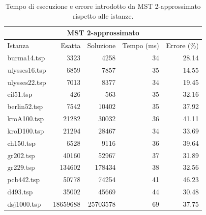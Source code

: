 \begin{table}[h]
    \centering

    \begin{tabular}{lrrrr}
    \toprule
    \multicolumn{5}{c}{MST 2-approssimato} \\
    \hline
     Istanza       &   Esatta &        Soluzione &   Tempo (ms) &   Errore (\%) \\
    \hline
    burma14.tsp   &     3323 &   4258           &          34 &       28.14 \\
    ulysses16.tsp &     6859 &   7857           &          35 &       14.55 \\
    ulysses22.tsp &     7013 &   8377           &          34 &       19.45 \\
    eil51.tsp     &      426 &    563           &          35 &       32.16 \\
    berlin52.tsp  &     7542 &  10402           &          35 &       37.92 \\
    kroA100.tsp   &    21282 &  30032           &          36 &       41.11 \\
    kroD100.tsp   &    21294 &  28467           &          34 &       33.69 \\
    ch150.tsp     &     6528 &   9116           &          36 &       39.64 \\
    gr202.tsp     &    40160 &  52967           &          37 &       31.89 \\
    gr229.tsp     &   134602 & 178434           &          38 &       32.56 \\
    pcb442.tsp    &    50778 &  74254           &          41 &       46.23 \\
    d493.tsp      &    35002 &  45669           &          44 &       30.48 \\
    dsj1000.tsp   & 18659688 &  25703578   &          69 &       37.75 \\
    \bottomrule
    \end{tabular}

    \caption{Tempo di esecuzione e errore introdotto da MST 2-approssimato rispetto alle istanze.}
    \label{table:mst2approx-runtime-accuracy}
\end{table}

